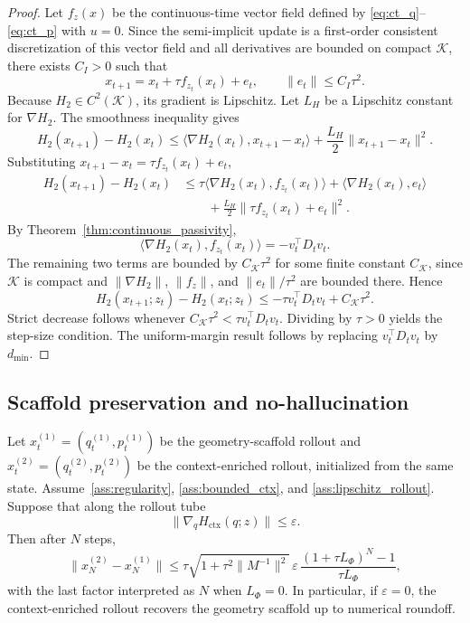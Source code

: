\begin{proof}
Let \(f_z(x)\) be the continuous-time vector field defined by
\eqref{eq:ct_q}--\eqref{eq:ct_p} with \(u=0\). Since the semi-implicit update is a
first-order consistent discretization of this vector field and all derivatives are bounded
on compact \(\mathcal K\), there exists \(C_I>0\) such that
\[
    x_{t+1}=x_t+\tau f_{z_t}(x_t)+e_t,
    \qquad
    \|e_t\|\le C_I\tau^2 .
\]
Because \(H_2\in C^2(\mathcal K)\), its gradient is Lipschitz. Let \(L_H\) be a
Lipschitz constant for \(\nabla H_2\). The smoothness inequality gives
\[
    H_2(x_{t+1})-H_2(x_t)
    \le
    \langle\nabla H_2(x_t),x_{t+1}-x_t\rangle
    +
    \frac{L_H}{2}\|x_{t+1}-x_t\|^2 .
\]
Substituting \(x_{t+1}-x_t=\tau f_{z_t}(x_t)+e_t\),
\begin{align*}
    H_2(x_{t+1})-H_2(x_t)
    &\le
    \tau\langle\nabla H_2(x_t),f_{z_t}(x_t)\rangle
    +
    \langle\nabla H_2(x_t),e_t\rangle  \\
    &\qquad
    +
    \frac{L_H}{2}\|\tau f_{z_t}(x_t)+e_t\|^2 .
\end{align*}
By Theorem~\ref{thm:continuous_passivity},
\[
    \langle\nabla H_2(x_t),f_{z_t}(x_t)\rangle
    =
    -v_t^\top D_tv_t .
\]
The remaining two terms are bounded by \(C_{\mathcal K}\tau^2\) for some finite
constant \(C_{\mathcal K}\), since \(\mathcal K\) is compact and
\(\|\nabla H_2\|\), \(\|f_z\|\), and \(\|e_t\|/\tau^2\) are bounded there. Hence
\[
    H_2(x_{t+1};z_t)-H_2(x_t;z_t)
    \le
    -\tau v_t^\top D_tv_t+C_{\mathcal K}\tau^2 .
\]
Strict decrease follows whenever
\(C_{\mathcal K}\tau^2<\tau v_t^\top D_tv_t\). Dividing by \(\tau>0\) yields the
step-size condition. The uniform-margin result follows by replacing
\(v_t^\top D_tv_t\) by \(d_{\min}\).
\end{proof}

\subsection{Scaffold preservation and no-hallucination}

\begin{theorem}
\label{thm:scaffold_preservation}
Let \(x_t^{(1)}=(q_t^{(1)},p_t^{(1)})\) be the geometry-scaffold rollout and
\(x_t^{(2)}=(q_t^{(2)},p_t^{(2)})\) be the context-enriched rollout, initialized from the same
state. Assume~\ref{ass:regularity}, \ref{ass:bounded_ctx}, and
\ref{ass:lipschitz_rollout}. Suppose that along the rollout tube
\[
    \|\nabla_qH_{\mathrm{ctx}}(q;z)\|\le \varepsilon .
\]
Then after \(N\) steps,
\[
    \|x_N^{(2)}-x_N^{(1)}\|
    \le
    \tau\sqrt{1+\tau^2\|M^{-1}\|^2}\,
    \varepsilon\,
    \frac{(1+\tau L_\Phi)^N-1}{\tau L_\Phi},
\]
with the last factor interpreted as \(N\) when \(L_\Phi=0\). In particular, if
\(\varepsilon=0\), the context-enriched rollout recovers the geometry scaffold up to numerical
roundoff.
\end{theorem}

